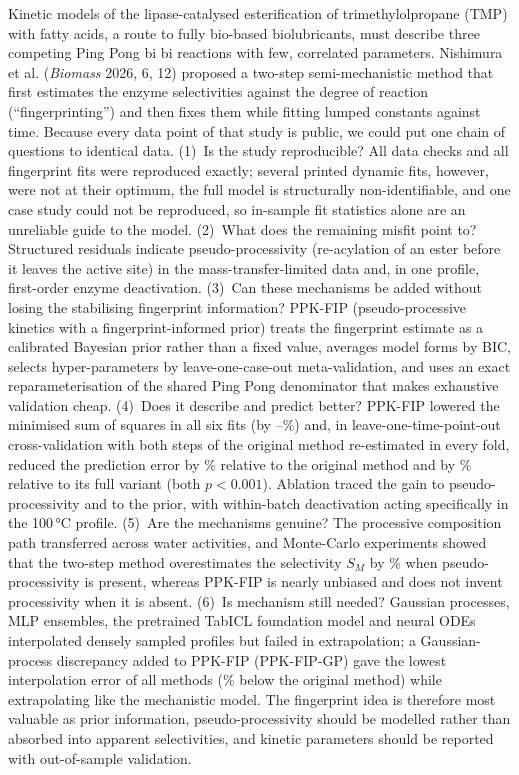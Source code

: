 Kinetic models of the lipase-catalysed esterification of trimethylolpropane (TMP) with fatty acids, a route to fully bio-based biolubricants, must describe three competing Ping Pong bi bi reactions with few, correlated parameters. Nishimura et al. (\emph{Biomass} 2026, 6, 12) proposed a two-step semi-mechanistic method that first estimates the enzyme selectivities against the degree of reaction (``fingerprinting'') and then fixes them while fitting lumped constants against time. Because every data point of that study is public, we could put one chain of questions to identical data. (1)~Is the study reproducible? All \NCheckAll{} data checks and all fingerprint fits were reproduced exactly; several printed dynamic fits, however, were not at their optimum, the full model is structurally non-identifiable, and one case study could not be reproduced, so in-sample fit statistics alone are an unreliable guide to the model. (2)~What does the remaining misfit point to? Structured residuals indicate pseudo-processivity (re-acylation of an ester before it leaves the active site) in the mass-transfer-limited data and, in one profile, first-order enzyme deactivation. (3)~Can these mechanisms be added without losing the stabilising fingerprint information? PPK-FIP (pseudo-processive kinetics with a fingerprint-informed prior) treats the fingerprint estimate as a calibrated Bayesian prior rather than a fixed value, averages model forms by BIC, selects hyper-parameters by leave-one-case-out meta-validation, and uses an exact reparameterisation of the shared Ping Pong denominator that makes exhaustive validation cheap. (4)~Does it describe and predict better? PPK-FIP lowered the minimised sum of squares in all six fits (by \InAkSeventyRed--\InAkHundredRed\%) and, in leave-one-time-point-out cross-validation with both steps of the original method re-estimated in every fold, reduced the prediction error by \LotoAllRedOrig\% relative to the original method and by \LotoAllRedFull\% relative to its full variant (both $p<0.001$). Ablation traced the gain to pseudo-processivity and to the prior, with within-batch deactivation acting specifically in the 100\,°C profile. (5)~Are the mechanisms genuine? The processive composition path transferred across water activities, and Monte-Carlo experiments showed that the two-step method overestimates the selectivity $S_M$ by \SimSMBiasOrigPct\% when pseudo-processivity is present, whereas PPK-FIP is nearly unbiased and does not invent processivity when it is absent. (6)~Is mechanism still needed? Gaussian processes, MLP ensembles, the pretrained TabICL foundation model and neural ODEs interpolated densely sampled profiles but failed in extrapolation; a Gaussian-process discrepancy added to PPK-FIP (PPK-FIP-GP) gave the lowest interpolation error of all methods (\HybLotoRedOrig\% below the original method) while extrapolating like the mechanistic model. The fingerprint idea is therefore most valuable as prior information, pseudo-processivity should be modelled rather than absorbed into apparent selectivities, and kinetic parameters should be reported with out-of-sample validation.
